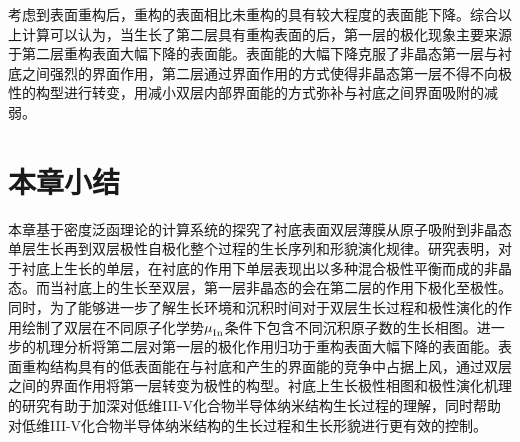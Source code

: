考虑到表面重构后，重构的表面相比未重构的具有较大程度的表面能下降。综合以上计算可以认为，当生长了第二层具有重构表面的后，第一层的极化现象主要来源于第二层重构表面大幅下降的表面能。表面能的大幅下降克服了非晶态第一层与衬底之间强烈的界面作用，第二层通过界面作用的方式使得非晶态第一层不得不向极性的构型进行转变，用减小双层内部界面能的方式弥补与衬底之间界面吸附的减弱。

\section{本章小结}
本章基于密度泛函理论的计算系统的探究了衬底表面双层薄膜从原子吸附到非晶态单层生长再到双层极性自极化整个过程的生长序列和形貌演化规律。研究表明，对于衬底上生长的单层，在衬底的作用下单层表现出以多种混合极性平衡而成的非晶态。而当衬底上的生长至双层，第一层非晶态的会在第二层的作用下极化至极性。同时，为了能够进一步了解生长环境和沉积时间对于双层生长过程和极性演化的作用绘制了双层在不同原子化学势$\it \mu_{\rm In}^{\rm } \it$条件下包含不同沉积原子数的生长相图。进一步的机理分析将第二层对第一层的极化作用归功于重构表面大幅下降的表面能。表面重构结构具有的低表面能在与衬底和产生的界面能的竞争中占据上风，通过双层之间的界面作用将第一层转变为极性的构型。衬底上生长极性相图和极性演化机理的研究有助于加深对低维III-V化合物半导体纳米结构生长过程的理解，同时帮助对低维III-V化合物半导体纳米结构的生长过程和生长形貌进行更有效的控制。